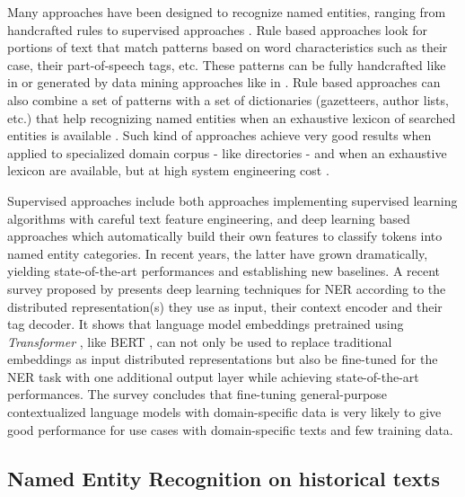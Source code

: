 Many approaches have been designed to recognize named entities, ranging from handcrafted rules to supervised approaches \cite{nadeau2007}.
Rule based approaches look for portions of text that match patterns based on word characteristics such as their case, their part-of-speech tags, etc.
These patterns can be fully handcrafted like in \cite{bell2020automated} or generated by data mining approaches like in \cite{nouvel2011}.
Rule based approaches can also combine a set of patterns with a set of dictionaries (gazetteers, author lists, etc.) that help recognizing named entities when an exhaustive lexicon of searched entities is available \cite{mansouri2008,maurel2011}.
Such kind of approaches achieve very good results when applied to specialized domain corpus - like directories - and when an exhaustive lexicon are available, but at high system engineering cost \cite{nadeau2007}. 

Supervised approaches include both approaches implementing supervised learning algorithms with careful text feature engineering, and deep learning based approaches which automatically build their own features to classify tokens into named entity categories.
In recent years, the latter have grown dramatically, yielding state-of-the-art performances and establishing new baselines\cite{li2020}.
A recent survey proposed by \cite{li2020} presents deep learning techniques for NER according to the distributed representation(s) they use as input, their context encoder and their tag decoder.
It shows that language model embeddings pretrained using \textit{Transformer} \cite{vaswani2017attention}, like BERT \cite{devlin2018bert}, can not only be used to replace traditional embeddings as input distributed representations but also be fine-tuned for the NER task with one additional output layer while achieving state-of-the-art performances.
The survey concludes that fine-tuning general-purpose contextualized language models with domain-specific data is very likely to give good performance for use cases with domain-specific texts and few training data.

\subsection{Named Entity Recognition on historical texts}

